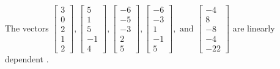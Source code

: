 \begin{exercise}
\begin{exerciseStatement}
  \end{exerciseStatement}
  \begin{exerciseAnswer}
   The vectors \(\left[\begin{array}{r}
3 \\
0 \\
2 \\
1 \\
2
\end{array}\right] , \left[\begin{array}{r}
5 \\
1 \\
5 \\
-1 \\
4
\end{array}\right] , \left[\begin{array}{r}
-6 \\
-5 \\
-3 \\
2 \\
5
\end{array}\right] , \left[\begin{array}{r}
-6 \\
-3 \\
1 \\
-1 \\
5
\end{array}\right] , \text{ and } \left[\begin{array}{r}
-4 \\
8 \\
-8 \\
-4 \\
-22
\end{array}\right]\) are 
  	 linearly dependent  .
  


  \end{exerciseAnswer}
\end{exercise}